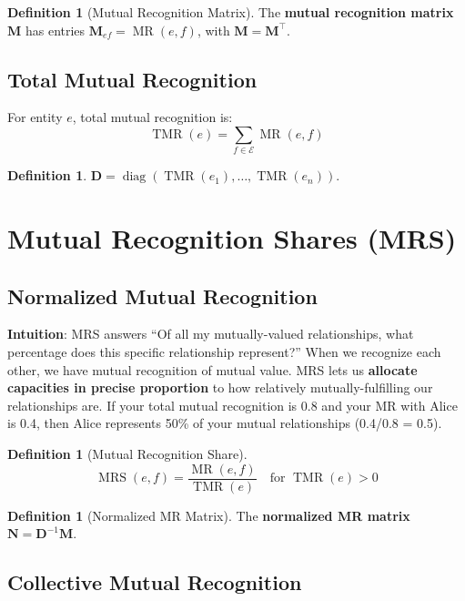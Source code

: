 \documentclass[11pt,a4paper]{article}
\theoremstyle{definition}
\newtheorem{definition}[theorem]{Definition}
\theoremstyle{remark}
\newcommand{\E}{\mathcal{E}}
\DeclareMathOperator{\TMR}{TMR}
\DeclareMathOperator{\MR}{MR}
\DeclareMathOperator{\MRS}{MRS}
\begin{document}
\begin{definition}[Mutual Recognition Matrix]
The \textbf{mutual recognition matrix} $\mathbf{M}$ has entries $\mathbf{M}_{ef} = \MR(e,f)$, with $\mathbf{M} = \mathbf{M}^\top$.
\end{definition}

\subsection{Total Mutual Recognition}

For entity $e$, total mutual recognition is:
\[ \TMR(e) = \sum_{f \in \E} \MR(e,f) \]

\begin{definition}
$\mathbf{D} = \operatorname{diag}(\TMR(e_1), \dots, \TMR(e_n))$.
\end{definition}

\section{Mutual Recognition Shares (MRS)}

\subsection{Normalized Mutual Recognition}

\textbf{Intuition}: MRS answers ``Of all my mutually-valued relationships, what percentage does this specific relationship represent?'' When we recognize each other, we have mutual recognition of mutual value. MRS lets us \textbf{allocate capacities in precise proportion} to how relatively mutually-fulfilling our relationships are. If your total mutual recognition is 0.8 and your MR with Alice is 0.4, then Alice represents 50\% of your mutual relationships (0.4/0.8 = 0.5).

\begin{definition}[Mutual Recognition Share]
\[ \MRS(e,f) = \frac{\MR(e,f)}{\TMR(e)} \quad \text{for } \TMR(e) > 0 \]
\end{definition}

\begin{definition}[Normalized MR Matrix]
The \textbf{normalized MR matrix} $\mathbf{N} = \mathbf{D}^{-1}\mathbf{M}$.
\end{definition}

\subsection{Collective Mutual Recognition}
\end{document}
